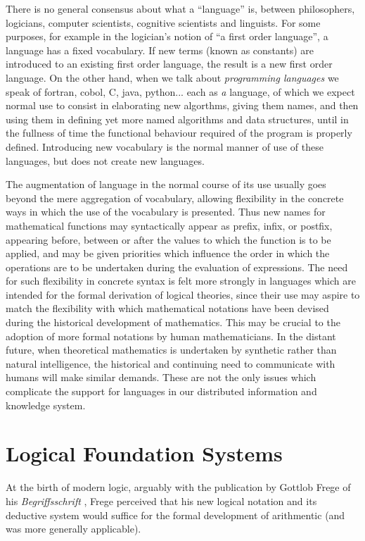 \documentclass[10pt,titlepage]{article}
\begin{document}
There is no general consensus about what a ``language'' is, between philosophers, logicians, computer scientists, cognitive scientists and linguists.
For some purposes, for example in the logician's notion of ``a first order language'', a language has a fixed vocabulary.
If new terms (known as constants) are introduced to an existing first order language, the result is a new first order language.
On the other hand, when we talk about \emph{programming languages} we speak of fortran, cobol, C, java, python... each as \emph{a} language, of which we expect normal use to consist in elaborating new algorthms, giving them names, and then using them in defining yet more named  algorithms and data structures, until in the fullness of time the functional behaviour required of the program is properly defined.
Introducing new vocabulary is the normal manner of use of these languages, but does not create new languages.

The augmentation of language in the normal course of its use usually goes beyond the mere aggregation of vocabulary, allowing flexibility in the concrete ways in which the use of the vocabulary is presented.
Thus new names for mathematical functions may syntactically appear as prefix, infix, or postfix, appearing before, between or after the values to which the function is to be applied, and may be given priorities which influence the order in which the operations are to be undertaken during the evaluation of expressions.
The need for such flexibility in concrete syntax is felt more strongly in languages which are intended for the formal derivation of logical theories, since their use may aspire to match the flexibility with which mathematical notations have been devised during the historical development of mathematics.
This may be crucial to the adoption of more formal notations by human mathematicians.
In the distant future, when theoretical mathematics is undertaken by synthetic rather than natural intelligence, the historical and continuing need to communicate with humans will make similar demands.
These are not the only issues which complicate the support for languages in our distributed information and knowledge system.

\section{Logical Foundation Systems}

At the birth of modern logic, arguably with the publication by Gottlob Frege of his \emph{Begriffsschrift} \cite{frege1879}, Frege perceived that his new logical notation and its deductive system would suffice for the formal development of arithmentic (and was more generally applicable).
\end{document}
